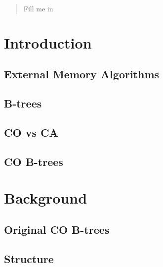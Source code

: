 \documentclass{style}
\begin{document}
\newcommand{\lhyperceil}{\lceil\lceil}
\newcommand{\rhyperceil}{\rceil\rceil}
\newcommand{\lhyperfloor}{\lfloor\lfloor}
\newcommand{\rhyperfloor}{\rfloor\rfloor}

\newcommand{\Search}{\textsc{Search(k)}}
\newcommand{\Insert}{\textsc{Insert(k, v)}}
\newcommand{\Scan}{\textsc{Scan(a, b)}}
\newcommand{\Delete}{\textsc{Delete(k)}}

\maketitle
\begin{abstract}
Fill me in
\end{abstract}

\section{Introduction}

\subsection{External Memory Algorithms}

\subsection{B-trees}

\subsection{CO vs CA}

\subsection{CO B-trees}

\section{Background}

\subsection{Original CO B-trees}
\label{sec:original}


\subsection{Structure}
\label{sec:structure}
\end{document}
